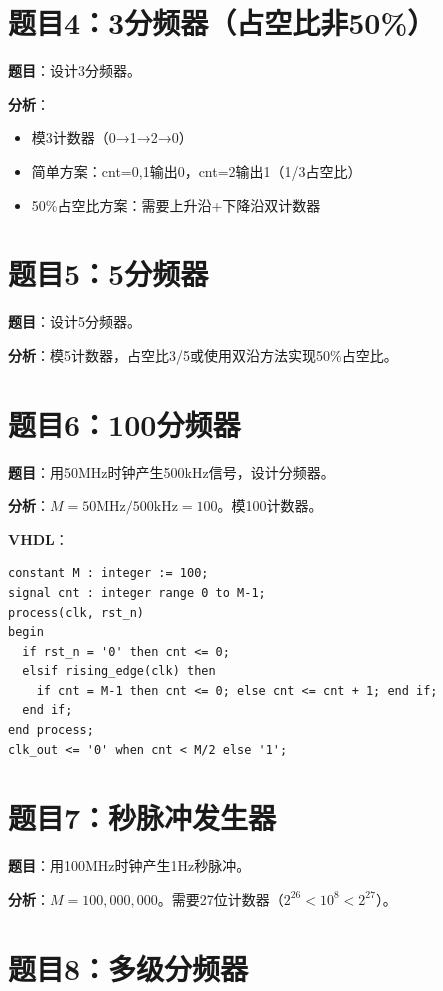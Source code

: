 \section*{题目4：3分频器（占空比非50\%）}

\textbf{题目}：设计3分频器。

\textbf{分析}：
\begin{itemize}
  \item 模3计数器（0→1→2→0）
  \item 简单方案：cnt=0,1输出0，cnt=2输出1（1/3占空比）
  \item 50\%占空比方案：需要上升沿+下降沿双计数器
\end{itemize}

\section*{题目5：5分频器}

\textbf{题目}：设计5分频器。

\textbf{分析}：模5计数器，占空比3/5或使用双沿方法实现50\%占空比。

\section*{题目6：100分频器}

\textbf{题目}：用50MHz时钟产生500kHz信号，设计分频器。

\textbf{分析}：$M = 50\text{MHz} / 500\text{kHz} = 100$。模100计数器。

\textbf{VHDL}：
\begin{lstlisting}
constant M : integer := 100;
signal cnt : integer range 0 to M-1;
process(clk, rst_n)
begin
  if rst_n = '0' then cnt <= 0;
  elsif rising_edge(clk) then
    if cnt = M-1 then cnt <= 0; else cnt <= cnt + 1; end if;
  end if;
end process;
clk_out <= '0' when cnt < M/2 else '1';
\end{lstlisting}

\section*{题目7：秒脉冲发生器}

\textbf{题目}：用100MHz时钟产生1Hz秒脉冲。

\textbf{分析}：$M = 100,000,000$。需要27位计数器（$2^{26} < 10^8 < 2^{27}$）。

\section*{题目8：多级分频器}

